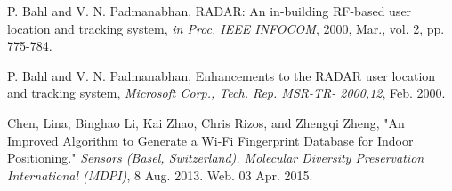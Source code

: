 \documentclass[conference]{IEEEtran}
\begin{document}
\begin{thebibliography}{99}
 P. Bahl and V. N. Padmanabhan,
RADAR: An in-building RF-based user location and tracking system,
\emph{in Proc. IEEE INFOCOM}, 2000, Mar., vol. 2, pp. 775-784.

 P. Bahl and V. N. Padmanabhan,
Enhancements to the RADAR user location and tracking system,
\emph{Microsoft Corp., Tech. Rep. MSR-TR- 2000,12}, Feb. 2000.

 Chen, Lina, Binghao Li, Kai Zhao, Chris Rizos, and Zhengqi Zheng,
"An Improved Algorithm to Generate a Wi-Fi Fingerprint Database for Indoor Positioning."
\emph{Sensors (Basel, Switzerland). Molecular Diversity Preservation International (MDPI)}, 8 Aug. 2013. Web. 03 Apr. 2015.


\end{thebibliography}



\end{document}
